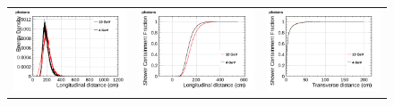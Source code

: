 \begin{figure}[htp]
\begin{tabular}{ccc}
 
    \includegraphics[scale=0.15]{figures/photons_density_overlay}&
    \includegraphics[scale=0.15]{figures/photons_lcont_overlay}&
    \includegraphics[scale=0.15]{figures/photons_wcont_overlay}\\
 


\end{tabular}
\end{figure}
